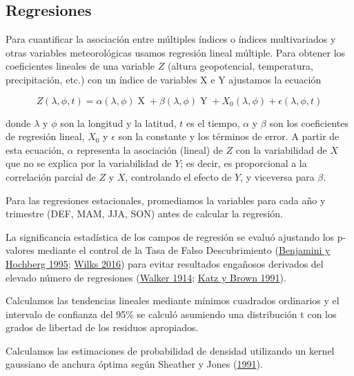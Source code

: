 \documentclass[12pt,oneside,a4paper]{reedthesis}
\begin{document}
\hypertarget{regresiones}{%
\subsection{Regresiones}\label{regresiones}}

Para cuantificar la asociación entre múltiples índices o índices multivariados y otras variables meteorológicas usamos regresión lineal múltiple.
Para obtener los coeficientes lineales de una variable \(Z\) (altura geopotencial, temperatura, precipitación, etc.) con un índice de variables X e Y ajustamos la ecuación

\begin{equation}
Z(\lambda, \phi, t) = \alpha(\lambda, \phi) \operatorname{X} + \beta(\lambda, \phi) \operatorname{Y} + X_0(\lambda, \phi) + \epsilon(\lambda, \phi, t)
\label{eq:multiple-regression-sam}
\end{equation}

donde \(\lambda\) y \(\phi\) son la longitud y la latitud, \(t\) es el tiempo, \(\alpha\) y \(\beta\) son los coeficientes de regresión lineal, \(X_0\) y \(\epsilon\) son la constante y los términos de error.
A partir de esta ecuación, \(\alpha\) representa la asociación (lineal) de \(Z\) con la variabilidad de \(X\) que no se explica por la variabilidad de \(Y\); es decir, es proporcional a la correlación parcial de \(Z\) y \(X\), controlando el efecto de \(Y\), y viceversa para \(\beta\).

Para las regresiones estacionales, promediamos la variables para cada año y trimestre (DEF, MAM, JJA, SON) antes de calcular la regresión.

La significancia estadística de los campos de regresión se evaluó ajustando los p-valores mediante el control de la Tasa de Falso Descubrimiento (\protect\hyperlink{ref-benjamini1995}{Benjamini y Hochberg 1995}; \protect\hyperlink{ref-wilks2016}{Wilks 2016}) para evitar resultados engañosos derivados del elevado número de regresiones (\protect\hyperlink{ref-walker1914}{Walker 1914}; \protect\hyperlink{ref-katz1991}{Katz y Brown 1991}).

Calculamos las tendencias lineales mediante mínimos cuadrados ordinarios y el intervalo de confianza del 95\% se calculó asumiendo una distribución t con los grados de libertad de los residuos apropiados.

Calculamos las estimaciones de probabilidad de densidad utilizando un kernel gaussiano de anchura óptima según Sheather y Jones (\protect\hyperlink{ref-sheather1991}{1991}).
\end{document}
